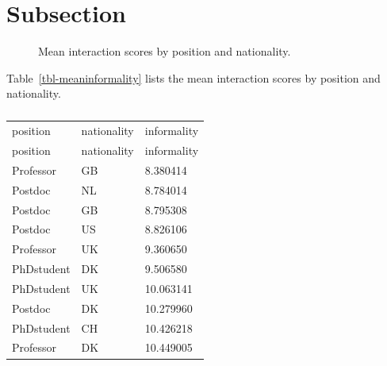\documentclass[
  a4paper,
]{scrbook}
\begin{document}
\section{Subsection}\label{subsection}

\begin{figure}[H]


\caption{\label{fig-meaninformality}Mean interaction scores by position
and nationality.}

\end{figure}%

Table~\ref{tbl-meaninformality} lists the mean interaction scores by
position and nationality.

\begin{longtable}[]{@{}lll@{}}

\caption{\label{tbl-meaninformality}Mean interaction scores by position
and nationality.}

\tabularnewline

\caption{}\label{T_da10d}\tabularnewline
\toprule\noalign{}
position & nationality & informality \\
\midrule\noalign{}
\endfirsthead
\toprule\noalign{}
position & nationality & informality \\
\midrule\noalign{}
\endhead
\bottomrule\noalign{}
\endlastfoot
Professor & GB & 8.380414 \\
Postdoc & NL & 8.784014 \\
Postdoc & GB & 8.795308 \\
Postdoc & US & 8.826106 \\
Professor & UK & 9.360650 \\
PhDstudent & DK & 9.506580 \\
PhDstudent & UK & 10.063141 \\
Postdoc & DK & 10.279960 \\
PhDstudent & CH & 10.426218 \\
Professor & DK & 10.449005 \\

\end{longtable}
\end{document}
